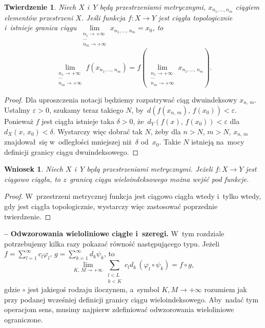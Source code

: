 \documentclass[a4paper,11pt]{article}
\newtheorem{twr}{Twierdzenie}
\newtheorem{wni}{Wniosek}%
\newcommand{\ld}{\ldots}
\newcommand{\ra}{\rightarrow}
\newcommand{\wtw}{wtedy i~tylko wtedy}
\newcommand{\del}{\delta}
\newcommand{\veps}{\varepsilon}
\newcommand{\vp}{\varphi}
\newcommand{\Lim}{\lim\limits}
\newcommand{\Sum}{\sum\limits}
\newcommand{\tb}{\textbf}
\newcommand{\noi}{\noindent}
\newcommand{\start}{\noi \tb{--} {}}
\newcommand{\ci}{\circ}
\begin{document}
\begin{twr}
  Niech $X$ i~$Y$ będą przestrzeniami metrycznymi,
  $x_{ n_{ 1 }, \ld, n_{ m } }$ ciągiem elementów przestrzeni $X$.
  Jeśli funkcja $f: X \ra Y$ jest ciągła topologicznie i~istnieje
  granica ciągu
  $\Lim_{ \substack{ n_{ 1 } \ra +\infty \\ \cdots \\ n_{ m } \ra
      +\infty } } x_{ n_{ 1 }, \ld, \, n_{ m } } = x_{ 0 }$, to
  \begin{equation}
    \Lim_{ \substack{ n_{ 1 } \ra +\infty \\ \cdots \\  n_{ m } \ra +\infty } }
    f( x_{ n_{ 1 }, \ld, \, n_{ m } } )
    = f( \Lim_{ \substack{ n_{ 1 } \ra +\infty \\ \cdots \\ n_{ m } \ra
        +\infty } } x_{ n_{ 1 }, \ld, \, n_{ m } } ).
  \end{equation}
\end{twr}

\begin{proof}
  Dla uproszczenia notacji będziemy rozpatrywać ciąg dwuindeksowy
  $x_{ n, \, m }$. Ustalmy $\veps > 0$, szukamy teraz takiego $N$,
  by~$d( f( x_{ n, \, m } ),\, f( x_{ 0 } ) ) < \veps$. Ponieważ $f$
  jest ciągła istnieje taka $\del > 0$, \linebreak
  że~$d_{ Y }( f( x ),\, f( x_{ 0 } ) ) < \veps$
  dla~$d_{ X }( x,\, x_{ 0 } ) < \del$. Wystarczy więc dobrać tak $N$,
  żeby dla $n > N$, $m > N$, $x_{ n, \, m }$ znajdował~się
  w~odległości mniejszej niż~$\del$ od~$x_{ 0 }$. Takie $N$ istnieją
  na~mocy definicji granicy ciągu dwuindeksowego.
\end{proof}

\begin{wni}
  Niech $X$ i~$Y$ będą przestrzeniami metrycznymi. Jeżeli $f: X \ra Y$
  jest ciągowo ciągła, to z~granicą ciągu wieloindeksowego można wejść
  pod funkcje.
\end{wni}

\begin{proof}
  W~przestrzeni metrycznej funkcja jest ciągowo ciągła \wtw, gdy jest
  ciągła topologicznie, wystarczy więc zastosować poprzednie
  twierdzenie.
\end{proof}

\start \tb{Odwzorowania wieloliniowe ciągłe i~szeregi.} W~tym
rozdziale
potrzebujemy kilka razy pokazać równość następującego typu. Jeżeli
$f = \sum_{ l = 1 }^{ \infty } c_{ l } \vp_{ l }$,
$g = \sum_{ k = 1 }^{ \infty } d_{ k } \psi_{ k }$, to
\begin{equation*}
  \Lim_{ K,\, M \ra +\infty } \Sum_{ \substack{ l < L \\ k < K } }
  c_{ l } d_{ k } \, (\vp_{ l } \ci \psi_{ k } ) = f \ci g,
\end{equation*}
gdzie $\ci$ jest jakiegoś rodzaju iloczynem, a~symbol
$K, M \ra +\infty$ rozumiem jak przy podanej wcześniej definicji
granicy ciągu wieloindeksowego. Aby~nadać tym operacjom sens, musimy
najpierw zdefiniować odwzorowania wieloliniowe ograniczone.
\end{document}
